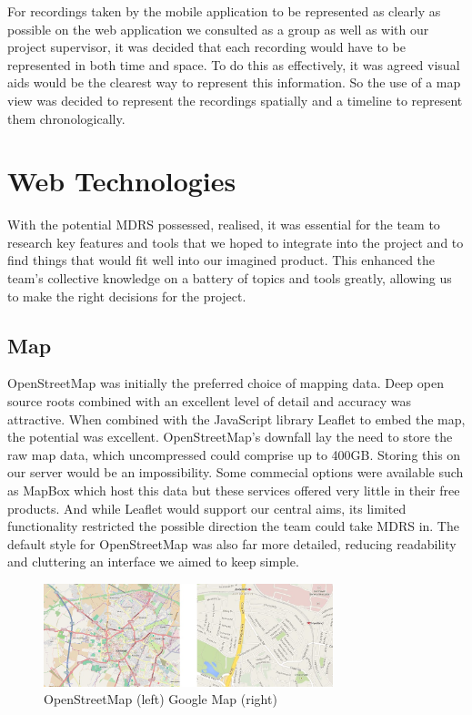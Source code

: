 \documentclass{l3proj}
\begin{document}
For recordings taken by the mobile application to be represented as clearly as possible on the web application we consulted as a group as well as with our project supervisor, it was decided that each recording would have to be represented in both time and space. To do this as effectively, it was agreed visual aids would be the clearest way to represent this information. So the use of a map view was decided to represent the recordings spatially and a timeline to represent them chronologically.

\section{Web Technologies}

With the potential MDRS possessed, realised, it was essential for the team to research key features and tools that we hoped to integrate into the project and to find things that would fit well into our imagined product. This enhanced the team's collective knowledge on a battery of topics and tools greatly, allowing us to make the right decisions for the project.

\subsection{Map}

OpenStreetMap\cite{openStreetMap} was initially the preferred choice of mapping data. Deep open source roots combined with an excellent level of detail and accuracy was attractive. When combined with the \gls{JavaScript} library \gls{Leaflet} to embed the map, the potential was excellent. OpenStreetMap's downfall lay the need to store the raw map data, which uncompressed could comprise up to 400GB. Storing this on our server would be an impossibility. Some commecial options were available such as MapBox which host this data but these services offered very little in their free products. And while Leaflet would support our central aims, its limited functionality restricted the possible direction the team could take MDRS in. The default style for OpenStreetMap was also far more detailed, reducing readability and cluttering an interface we aimed to keep simple.

\begin{figure}[ht!]
  \centering
\includegraphics[width=0.75\textwidth]{images/openstreetmap_google-map.jpg}
\caption{OpenStreetMap (left) Google Map (right)}
\end{figure}
\end{document}

